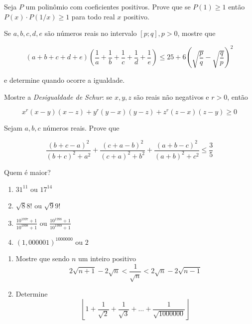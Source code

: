 \begin{questao}
  Seja $P$ um polinômio com coeficientes positivos. Prove que se $P(1) \geq 1$
  então $P(x) \cdot P(1/x) \geq 1$ para todo real $x$ positivo.
\end{questao}

\begin{questao}
  Se $a,b,c,d,e$ são números reais no intervalo $[p;q], p > 0$, mostre que

  $$(a+b+c+d+e)\left( \frac{1}{a} + \frac{1}{b} + \frac{1}{c} + \frac{1}{d} +
  \frac{1}{e} \right) \leq 25 + 6 \left( \sqrt{\frac{p}{q}} -\sqrt{\frac{q}{p}}
  \right)^2$$

  e determine quando ocorre a igualdade.
\end{questao}

\begin{questao}
  Mostre a {\it Desigualdade de Schur}: se $x,y,z$ são reais não negativos e
  $r>0$, então

  $$ x^r(x-y)(x-z) + y^r(y-x)(y-z) + z^r(z-x)(z-y) \geq 0 $$
\end{questao}

\begin{questao}
  Sejam $a,b,c$ números reais. Prove que

  $$ \frac{(b+c-a)^2}{(b+c)^2+a^2} + \frac{(c+a-b)^2}{(c+a)^2+b^2} +
  \frac{(a+b-c)^2}{(a+b)^2+c^2} \leq \frac{3}{5} $$
\end{questao}

\begin{questao}
  Quem é maior?

  \begin{enumerate}

  \item $31^{11}$ ou $17^{14}$

  \item $\sqrt{8}{8!}$ ou $\sqrt{9}{9!}$

  \item $\frac{10^{1997}+1}{10^{1998}+1}$ ou $\frac{10^{1998}+1}{10^{1999}+1}$

  \item $(1,000001)^{1000000}$ ou $2$
  \end{enumerate}

\end{questao}

\begin{questao}


  \begin{enumerate}

  \item Mostre que sendo $n$ um inteiro positivo
    $$ 2\sqrt{n+1}-2\sqrt{n} < \frac{1}{\sqrt{n}} < 2\sqrt{n}-2\sqrt{n-1}$$

  \item Determine
    $$ \left \lfloor
    1+\frac{1}{\sqrt{2}}+\frac{1}{\sqrt{3}}+\ldots+\frac{1}{\sqrt{1000000}}
    \right \rfloor $$
  \end{enumerate}

\end{questao}


